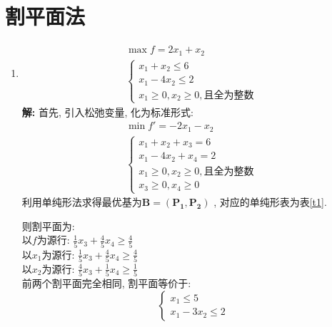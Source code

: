 \documentclass[11pt,AutoFakeBold]{article}
\begin{document}
\section{割平面法}
\begin{enumerate}
\item $$\begin{array}{l}
        \max f=2 x_{1}+x_{2} \\
        \left\{\begin{array}{l}
        x_{1}+x_{2} \leqslant 6 \\
        x_{1}-4 x_{2} \leqslant 2 \\
        x_{1} \geqslant 0, x_{2} \geqslant 0, \text {且全为整数 }
        \end{array}\right.
        \end{array} $$
 \textbf{解:}
首先, 引入松弛变量, 化为标准形式:
        $$\begin{array}{l}
        \min f'=-2 x_{1}-x_{2} \\
        \left\{\begin{array}{l}
        x_{1}+x_{2} +x_3= 6 \\
        x_{1}-4 x_{2} +x_4= 2 \\
        x_{1} \geqslant 0, x_{2} \geqslant 0, \text {且全为整数 }\\
        x_{3} \geqslant 0, x_{4} \geqslant 0
        \end{array}\right.
        \end{array} $$
利用单纯形法求得最优基为$\mathbf{B}=(\mathbf{P_1},\mathbf{P_2})$ ,
对应的单纯形表为表\ref{t1}.\\
        \begin{table}[!htbp]
        \centering
        \caption{第四题(1)单纯形表1}
        \label{t1}
        \end{table}

则割平面为:\\
以$f$为源行: $\frac{1}{5}x_3+\frac{4}{5}x_4\geqslant \frac{4}{5}$\\
以$x_1$为源行: $\frac{1}{5}x_3+\frac{4}{5}x_4\geqslant \frac{4}{5}$ \\
以$x_2$为源行: $\frac{4}{5}x_3+\frac{1}{5}x_4\geqslant \frac{1}{5}$\\
前两个割平面完全相同, 割平面等价于:
$$\left\{\begin{array}{l}
         x_1\leqslant 5 \\ x_1-3x_2\leqslant 2               
\end{array}\right.$$


\end{enumerate}
\end{document}
